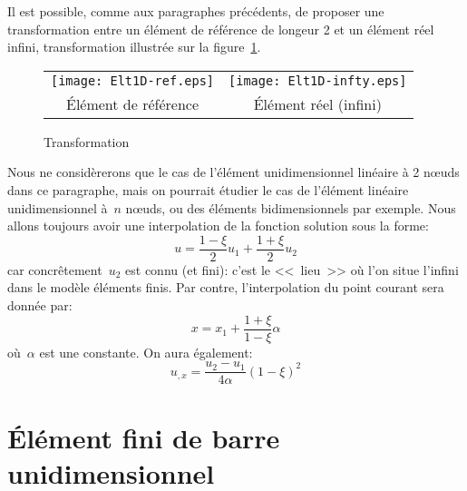 Il est possible, comme aux paragraphes précédents, de proposer une transformation
entre un élément de référence de longeur 2 et un élément réel infini, transformation illustrée sur la figure~\ref{fig:ex2:trans}.
\begin{figure}[ht]\centering
\begin{tabular}{cc}
\texttt{[image: Elt1D-ref.eps]} &
\texttt{[image: Elt1D-infty.eps]} \\
Élément de référence & Élément réel (infini)
\end{tabular}\caption{Transformation}\label{fig:ex2:trans}
\end{figure}
\medskipvm
Nous ne considèrerons que le cas de l'élément unidimensionnel linéaire à 2 nœuds dans ce paragraphe, mais on pourrait étudier le cas de l'élément linéaire unidimensionnel à~$n$ nœuds, ou des éléments bidimensionnels par exemple.
\medskipvm
Nous allons toujours avoir une interpolation de la fonction solution sous la forme:
\begin{equation} u =\frac{1-\xi}2 u_1 + \frac{1+\xi}2 u_2\end{equation}
car concrêtement~$u_2$ est connu (et fini): c'est le <<~lieu~>> où l'on situe l'infini dans le
modèle éléments finis.
\medskipvm
Par contre, l'interpolation du point courant sera donnée par:
\begin{equation}
x=x_1+\frac{1+\xi}{1-\xi}\alpha
\end{equation}
où~$\alpha$ est une constante.
\medskipvm
On aura également:
\begin{equation} u_{,x} = \frac{u_2-u_1}{4\alpha} (1-\xi)^2 \end{equation}
\medskipvm
\ifVersionAvecExemplesSepares
  \section{Élément fini de barre unidimensionnel}\label{Sec-barre1D}
\else
